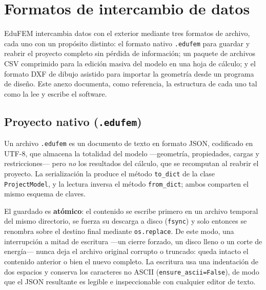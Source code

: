 



\chapter{Formatos de intercambio de datos}
\label{anexo:formatos}

EduFEM intercambia datos con el exterior mediante tres formatos de archivo, cada uno con un propósito distinto: el formato nativo \texttt{.edufem} para guardar y reabrir el proyecto completo sin pérdida de información; un paquete de archivos CSV comprimido para la edición masiva del modelo en una hoja de cálculo; y el formato DXF de dibujo asistido para importar la geometría desde un programa de diseño. Este anexo documenta, como referencia, la estructura de cada uno tal como la lee y escribe el software.

\section{Proyecto nativo (\texttt{.edufem})}

Un archivo \texttt{.edufem} es un documento de texto en formato JSON, codificado en UTF-8, que almacena la totalidad del modelo ---geometría, propiedades, cargas y restricciones--- pero \emph{no} los resultados del cálculo, que se recomputan al reabrir el proyecto. La serialización la produce el método \texttt{to\_dict} de la clase \texttt{ProjectModel}, y la lectura inversa el método \texttt{from\_dict}; ambos comparten el mismo esquema de claves.

El guardado es \textbf{atómico}: el contenido se escribe primero en un archivo temporal del mismo directorio, se fuerza su descarga a disco (\texttt{fsync}) y solo entonces se renombra sobre el destino final mediante \texttt{os.replace}. De este modo, una interrupción a mitad de escritura ---un cierre forzado, un disco lleno o un corte de energía--- nunca deja el archivo original corrupto o truncado: queda intacto el contenido anterior o bien el nuevo completo. La escritura usa una indentación de dos espacios y conserva los caracteres no ASCII (\texttt{ensure\_ascii=False}), de modo que el JSON resultante es legible e inspeccionable con cualquier editor de texto.

